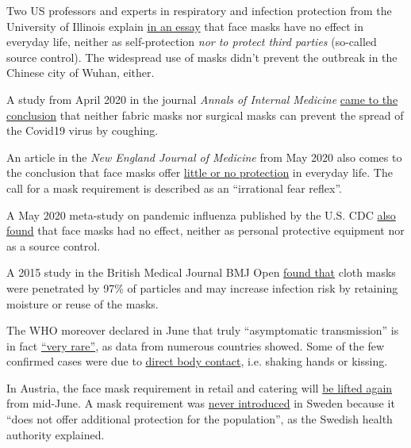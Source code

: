 Two US professors and experts in respiratory and infection protection
from the University of Illinois explain
\href{https://www.cidrap.umn.edu/news-perspective/2020/04/commentary-masks-all-covid-19-not-based-sound-data}{in
an essay} that face masks have no effect in everyday life, neither as
self-protection \emph{nor to protect third parties} (so-called source
control). The widespread use of masks didn't prevent the outbreak in the
Chinese city of Wuhan, either.

A study from April 2020 in the journal \emph{Annals of Internal
Medicine} \href{https://www.acpjournals.org/doi/10.7326/M20-1342}{came
to the conclusion} that neither fabric masks nor surgical masks can
prevent the spread of the Covid19 virus by coughing.

An article in the \emph{New England Journal of Medicine} from May 2020
also comes to the conclusion that face masks offer
\href{https://www.nejm.org/doi/full/10.1056/NEJMp2006372}{little or no
protection} in everyday life. The call for a mask requirement is
described as an ``irrational fear reflex''.

A May 2020 meta-study on pandemic influenza published by the U.S. CDC
\href{https://wwwnc.cdc.gov/eid/article/26/5/19-0994_article}{also
found} that face masks had no effect, neither as personal protective
equipment nor as a source control.

A 2015 study in the British Medical Journal BMJ Open
\href{https://bmjopen.bmj.com/content/5/4/e006577}{found that} cloth
masks were penetrated by 97\% of particles and may increase infection
risk by retaining moisture or reuse of the masks.

The WHO moreover declared in June that truly ``asymptomatic
transmission'' is in fact
\href{https://www.nationalreview.com/news/who-says-transmission-by-asymptomatic-covid-patients-very-rare/}{``very
rare''}, as data from numerous countries showed. Some of the few
confirmed cases were due to
\href{https://wwwnc.cdc.gov/eid/article/26/8/20-1235_article}{direct
body contact}, i.e. shaking hands or kissing.

In Austria, the face mask requirement in retail and catering will
\href{https://www.derstandard.at/story/2000117792769/die-maske-wird-wieder-zurueckgedraengt}{be
lifted again} from mid-June. A mask requirement was
\href{https://www.thelocal.se/20200514/explained-why-is-sweden-not-recommending-face-masks-to-the-public}{never
introduced} in Sweden because it ``does not offer additional protection
for the population'', as the Swedish health authority explained.

